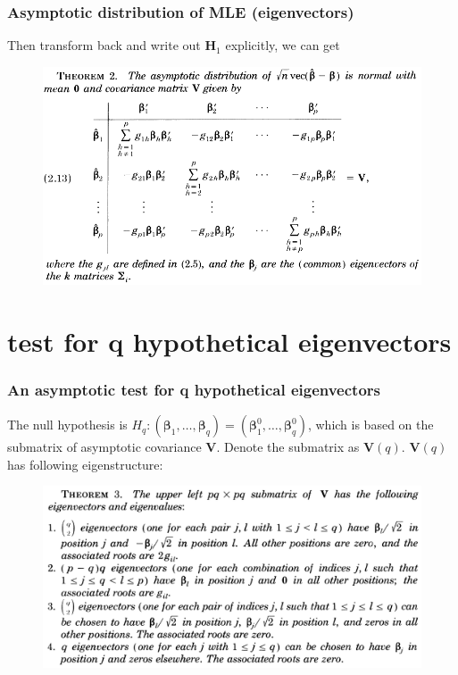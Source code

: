 \documentclass{beamer}
\begin{document}
	\begin{frame}
		\frametitle{Asymptotic distribution of MLE (eigenvectors)}
		Then transform back and write out $\bm{H}_1$ explicitly, we can get
		\begin{figure}
			\includegraphics[width=0.9\linewidth]{image009.png}
		\end{figure}
	\end{frame}
	
	\section{test for q hypothetical eigenvectors}
	
	
	\begin{frame}
		\frametitle{An asymptotic test for q hypothetical eigenvectors}
		The null hypothesis is $H_q: (\bm{\beta}_1,\ldots,\bm{\beta}_q) = (\bm{\beta}_1^0,\ldots,\bm{\beta}_q^0)$, which is based on the submatrix of asymptotic covariance $\bm{V}$. Denote the submatrix as $\bm{V}(q)$. $\bm{V}(q)$ has following eigenstructure:
		\begin{figure}
			\includegraphics[width=0.9\linewidth]{image010.png}
		\end{figure}
	\end{frame}
	
\end{document}
